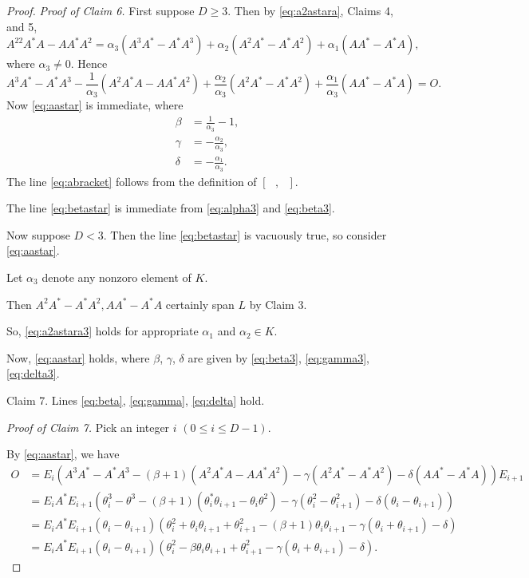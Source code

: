\documentclass[
]{book}
\theoremstyle{definition}
\theoremstyle{definition}
\theoremstyle{definition}
\theoremstyle{definition}
\theoremstyle{remark}
\begin{document}
\begin{proof}
\emph{Proof of Claim 6.}
First suppose \(D\geq 3\). Then by \eqref{eq:a2astara}, Claims 4, and 5,
\begin{equation}
A^22A^*A-AA^*A^2 = \alpha_3(A^3A^*-A^*A^3)+\alpha_2(A^2A^*-A^*A^2) + \alpha_1(AA^*-A^*A), \label{eq:a2astara3}
\end{equation}
where \(\alpha_3\neq 0\). Hence
\[A^3A^*-A^*A^3-\frac{1}{\alpha_3}(A^2A^*A-AA^*A^2)+\frac{\alpha_2}{\alpha_3}(A^2A^*-A^*A^2)+
\frac{\alpha_1}{\alpha_3}(AA^*-A^*A)=O.\]
Now \eqref{eq:aastar} is immediate, where
\begin{align}
\beta & = \frac{1}{\alpha_3}-1, \label{eq:beta3}\\
\gamma & = -\frac{\alpha_2}{\alpha_3}, \label{eq:gamma3}\\
\delta & = -\frac{\alpha_1}{\alpha_3}. \label{eq:delta3}
\end{align}
The line \eqref{eq:abracket} follows from the definition of \([\text{ }, \text{ }]\).

The line \eqref{eq:betastar} is immediate from \eqref{eq:alpha3} and \eqref{eq:beta3}.

Now suppose \(D < 3\). Then the line \eqref{eq:betastar} is vacuously true, so consider \eqref{eq:aastar}.

Let \(\alpha_3\) denote any nonzoro element of \(K\).

Then \(A^2A^*-A^*A^2, AA^*-A^*A\) certainly span \(L\) by Claim 3.

So, \eqref{eq:a2astara3} holds for appropriate \(\alpha_1\) and \(\alpha_2\in K\).

Now, \eqref{eq:aastar} holds, where \(\beta\), \(\gamma\), \(\delta\) are given by \eqref{eq:beta3}, \eqref{eq:gamma3}, \eqref{eq:delta3}.

Claim 7. Lines \eqref{eq:beta}, \eqref{eq:gamma}, \eqref{eq:delta} hold.

\emph{Proof of Claim 7.}
Pick an integer \(i\) \((0\leq i\leq D-1)\).

By \eqref{eq:aastar}, we have
\begin{align}
O & = E_i(A^3A^*-A^*A^3-(\beta+1)(A^2A^*A-AA^*A^2)-\gamma(A^2A^*-A^*A^2)-\delta(AA^*-A^*A))E_{i+1}\\
& = E_iA^*E_{i+1}(\theta^3_i-\theta^3-(\beta+1)(\theta^*_i\theta_{i+1}-\theta_i\theta^2)-\gamma(\theta^2_i-\theta^2_{i+1})-\delta(\theta_i-\theta_{i+1}))\\
& = E_iA^*E_{i+1}(\theta_i-\theta_{i+1})(\theta^2_i+\theta_i\theta_{i+1}+\theta_{i+1}^2-(\beta+1)\theta_i\theta_{i+1}-\gamma(\theta_i+\theta_{i+1})-\delta)\\
& = E_iA^*E_{i+1}(\theta_i-\theta_{i+1})(\theta^2_i-\beta\theta_i\theta_{i+1}+\theta_{i+1}^2-\gamma(\theta_i+\theta_{i+1})-\delta).
\end{align}


\end{proof}
\end{document}
